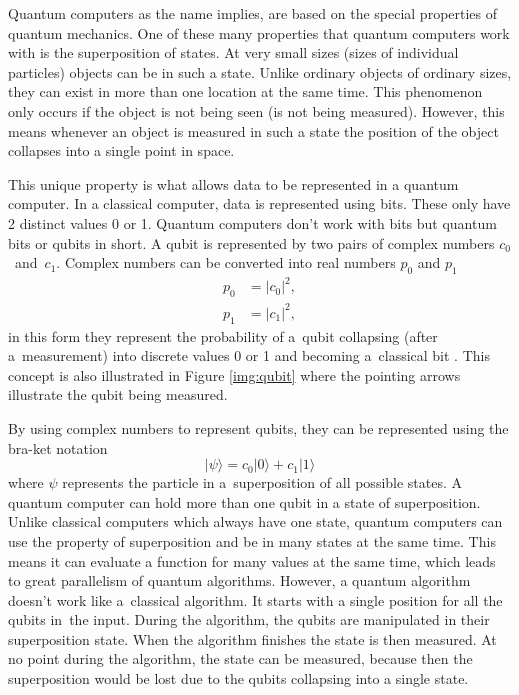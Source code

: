 Quantum computers as the name implies, are based on the special properties of quantum mechanics. One of these many properties that quantum computers work with is the superposition of states. At very small sizes (sizes of individual particles) objects can be in such a state. Unlike ordinary objects of ordinary sizes, they can exist in more than one location at the same time. This phenomenon only occurs if the object is not being seen (is not being measured). However, this means whenever an object is measured in such a state the position of the object collapses into a single point in space. \cite{Yanofsky2008}


This unique property is what allows data to be represented in a quantum computer. In a classical computer, data is represented using bits. These only have 2 distinct values 0 or 1. Quantum computers don't work with bits but quantum bits or qubits in short. A qubit is represented by two pairs of complex numbers $c_0$~and~$c_1$. Complex numbers can be converted into real numbers $p_0$ and $p_1$
\begin{equation}
  \begin{aligned}
    p_0 & = \lvert c_0 \rvert^2, \\
    p_1 & = \lvert c_1 \rvert^2,
  \end{aligned}
\end{equation}
in this form they represent the probability of a~qubit collapsing (after a~measurement) into discrete values 0 or 1 and becoming a~classical bit \cite{Yanofsky2008}. This concept is also illustrated in Figure \ref{img:qubit} where the pointing arrows illustrate the qubit being measured.

By using complex numbers to represent qubits, they can be represented using the bra-ket notation
\begin{equation}
  \lvert\psi\rangle=c_0|0\rangle + c_1|1\rangle
\end{equation}
where $\psi$ represents the particle in a~superposition of all possible states. A quantum computer can hold more than one qubit in a state of superposition. Unlike classical computers which always have one state, quantum computers can use the property of superposition and be in many states at the same time. This means it can evaluate a function for many values at the same time, which leads to great parallelism of quantum algorithms. However, a quantum algorithm doesn't work like a~classical algorithm. It starts with a single position for all the qubits in~the input. During the algorithm, the qubits are manipulated in their superposition state. When the algorithm finishes the state is then measured. At no point during the algorithm, the state can be measured, because then the superposition would be lost due to the qubits collapsing into a single state. \cite{Yanofsky2008}
